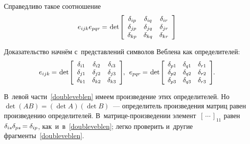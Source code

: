 \begin{otherlanguage}{russian}
Справедливо такое соотношение
\nopagebreak\vspace{.1em}
\begin{equation}\label{doubleveblen}
e_{ijk} e_{pqr} \hspace{-0.1ex} = \hspace{.2ex}
\operatorname{det}\hspace{-0.25ex} \left[\begin{array}{ccc}
\delta_{ip} & \delta_{iq} & \delta_{ir} \\
\delta_{jp} & \delta_{jq} & \delta_{jr} \\
\delta_{kp} & \delta_{kq} & \delta_{kr}
\end{array}\right]
\end{equation}

\noindent Доказательство начнём с~представлений символов Веблена как определителей:
\vspace{-0.5em}\[
e_{ijk} \hspace{-0.1ex} = \hspace{.2ex}
\operatorname{det}\hspace{-0.25ex} \scalebox{0.96}[0.96]{$\left[\begin{array}{ccc}
\delta_{i1} & \delta_{i2} & \delta_{i3} \\
\delta_{j1} & \delta_{j2} & \delta_{j3} \\
\delta_{k1} & \delta_{k2} & \delta_{k3}
\end{array}\right]$} \hspace{-0.25ex}, \:\:
e_{pqr} \hspace{-0.1ex} = \hspace{.2ex}
\operatorname{det}\hspace{-0.25ex} \scalebox{0.96}[0.96]{$\left[\begin{array}{ccc}
\delta_{p1} & \delta_{q1} & \delta_{r1} \\
\delta_{p2} & \delta_{q2} & \delta_{r2} \\
\delta_{p3} & \delta_{q3} & \delta_{r3}
\end{array}\right]$} \hspace{-0.25ex}.
\]

\vspace{-0.1em} \noindent В~левой части~\eqref{doubleveblen} имеем произведение этих определителей. Но~${\operatorname{det} (AB) = (\operatorname{det} A)(\operatorname{det} B)}$~--- определитель произведения матриц равен произведению определителей. В~матрице\hbox{-}произведении элемент~${\left[{\,\cdots\,}\right]}_{11}$ равен~${\delta_{is} \delta_{ps} \hspace{-0.2ex} = \delta_{ip}}$, как~и~в~\eqref{doubleveblen}; легко проверить и~другие фрагменты~\eqref{doubleveblen}.


\end{otherlanguage}
